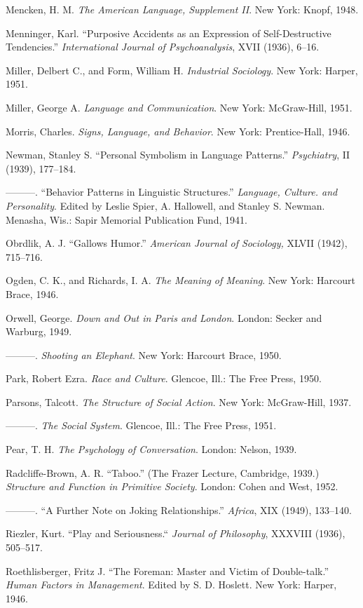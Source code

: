 \documentclass[twoside,symmetric,nobib,justified]{tufte-book}
\begin{document}
\begin{hangparas}{.25in}{1}
Mencken, H. M. \emph{The American Language, Supplement II}. New York:
Knopf, 1948.

Menninger, Karl. ``Purposive Accidents as an Expression of
Self-Destructive Tendencies.'' \emph{International Journal of
Psychoanalysis}, XVII (1936), 6--16.

Miller, Delbert C., and Form, William H. \emph{Industrial Sociology}.
New York: Harper, 1951.

Miller, George A. \emph{Language and Communication}. New York:
McGraw-Hill, 1951.

Morris, Charles. \emph{Signs, Language, and Behavior}. New York:
Prentice-Hall, 1946.

Newman, Stanley S. ``Personal Symbolism in Language Patterns.''
\emph{Psychiatry}, II (1939), 177--184.

---------. ``Behavior Patterns in Linguistic Structures.''
\emph{Language, Culture. and Personality}. Edited by Leslie Spier, A.
Hallowell, and Stanley S. Newman. Menasha, Wis.: Sapir Memorial
Publication Fund, 1941.

Obrdlik, A. J. ``Gallows Humor.'' \emph{American Journal of Sociology,}
XLVII (1942), 715--716.

Ogden, C. K., and Richards, I. A. \emph{The Meaning of Meaning}. New
York: Harcourt Brace, 1946.

Orwell, George. \emph{Down and Out in Paris and London}. London: Secker
and Warburg, 1949.

---------. \emph{Shooting an Elephant}. New York: Harcourt Brace, 1950.

Park, Robert Ezra. \emph{Race and Culture}. Glencoe, Ill.: The Free
Press, 1950.

Parsons, Talcott. \emph{The Structure of Social Action}. New York:
McGraw-Hill, 1937.

---------. \emph{The Social System}. Glencoe, Ill.: The Free Press,
1951.

Pear, T. H. \emph{The Psychology of Conversation}. London: Nelson, 1939.

Radcliffe-Brown, A. R. ``Taboo.'' (The Frazer Lecture, Cambridge, 1939.)
\emph{Structure and Function in Primitive Society}. London: Cohen and
West, 1952.

---------. ``A Further Note on Joking Relationships.'' \emph{Africa},
XIX (1949), 133--140.

Riezler, Kurt. ``Play and Seriousness.`` \emph{Journal of Philosophy},
XXXVIII (1936), 505--517.

Roethlisberger, Fritz J. ``The Foreman: Master and Victim of
Double-talk.'' \emph{Human Factors in Management}. Edited by S. D.
Hoslett. New York: Harper, 1946.


\end{hangparas}
\end{document}
